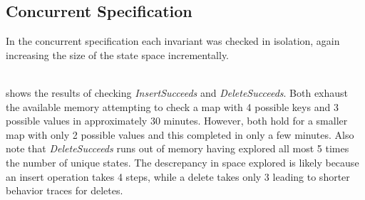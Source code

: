 \documentclass{uit-thesis}
\begin{document}
\subsection{Concurrent Specification}
In the concurrent specification each invariant was checked in isolation, again increasing the size of the state space incrementally.
\begin{table}[h]
    \centering
    \caption{TLC model checking results for SOConcurrent}
    \label{tab:SOConcurrent}
\end{table}
\\
 shows the results of checking \textit{InsertSucceeds} and \textit{DeleteSucceeds}. Both exhaust the available memory attempting to check a map with 4 possible keys and 3 possible values in approximately 30 minutes. However, both hold for a smaller map with only 2 possible values and this completed in only a few minutes. Also note that \textit{DeleteSucceeds} runs out of memory having explored all most 5 times the number of unique states. The descrepancy in space explored is likely because an insert operation takes 4 steps, while a delete takes only 3 leading to shorter behavior traces for deletes.
\end{document}
